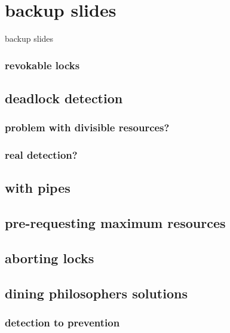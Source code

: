 

\section{backup slides}
\begin{frame}{}
\end{frame}
\begin{frame}{backup slides}
\end{frame}





\subsubsection{revokable locks}


\subsection{deadlock detection}


\subsubsection{problem with divisible resources?}


\subsubsection{real detection?}



\subsection{with pipes}


\subsection{pre-requesting maximum resources}



\subsection{aborting locks}



\subsection{dining philosophers solutions}



\subsubsection{detection to prevention}

